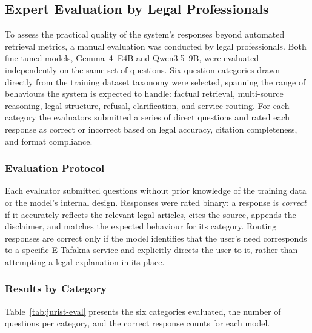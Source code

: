 \subsection{Expert Evaluation by Legal Professionals}
\label{subsec:ch4-jurist-eval}

To assess the practical quality of the system's responses beyond automated retrieval metrics, a manual evaluation was conducted by legal professionals. Both fine-tuned models, Gemma~4~E4B and Qwen3.5~9B, were evaluated independently on the same set of questions. Six question categories drawn directly from the training dataset taxonomy were selected, spanning the range of behaviours the system is expected to handle: factual retrieval, multi-source reasoning, legal structure, refusal, clarification, and service routing. For each category the evaluators submitted a series of direct questions and rated each response as correct or incorrect based on legal accuracy, citation completeness, and format compliance.

\subsubsection{Evaluation Protocol}

Each evaluator submitted questions without prior knowledge of the training data or the model's internal design. Responses were rated binary: a response is \textit{correct} if it accurately reflects the relevant legal articles, cites the source, appends the disclaimer, and matches the expected behaviour for its category. Routing responses are correct only if the model identifies that the user's need corresponds to a specific E-Tafakna service and explicitly directs the user to it, rather than attempting a legal explanation in its place.

\subsubsection{Results by Category}

Table~\ref{tab:jurist-eval} presents the six categories evaluated, the number of questions per category, and the correct response counts for each model.

